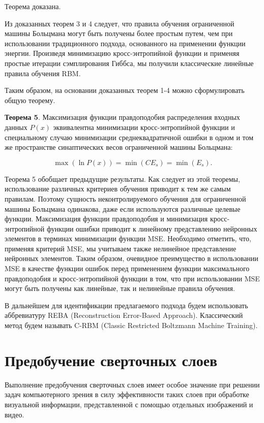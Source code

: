Теорема доказана.

Из доказанных теорем 3 и 4 следует, что правила обучения ограниченной машины Больцмана могут быть получены более простым путем, чем при использовании традиционного подхода, основанного на применении функции энергии. Произведя минимизацию кросс-энтропийной функции и применяя простые итерации сэмплирования Гиббса, мы получили классические линейные правила обучения RBM.

Таким образом, на основании доказанных теорем 1-4 можно сформулировать общую теорему.

\textbf{Теорема 5}. Максимизация функции правдоподобия распределения входных данных $P(x)$ эквивалентна минимизации кросс-энтропийной функции и специальному случаю минимизации среднеквадратичной ошибки в одном и том же пространстве синаптических весов ограниченной машины Больцмана:

\begin{equation}
	\max(\ln P(x)) = \min(CE_s) = \min(E_s).
\end{equation}

Теорема 5 обобщает предыдущие результаты. Как следует из этой теоремы, использование различных критериев обучения приводит к тем же самым правилам. Поэтому сущность неконтролируемого обучения для ограниченной машины Больцмана одинакова, даже если используются различные целевые функции. Максимизация функции правдоподобия и минимизация кросс-энтропийной функции ошибки приводит к линейному представлению нейронных элементов в терминах минимизации функции MSE. Необходимо отметить, что, применяя критерий MSE, мы учитываем также нелинейное представление нейронных элементов. Таким образом, очевидное преимущество в использовании MSE в качестве функции ошибок перед применением функции максимального правдоподобия и кросс-энтропийной функции в том, что при использовании MSE могут быть получены как линейные, так и нелинейные правила обучения.

В дальнейшем для идентификации предлагаемого подхода будем использовать аббревиатуру REBA (Reconstruction Error-Based Approach). Классический метод будем называть C-RBM (Classic Restricted Boltzmann Machine Training).

\section{Предобучение сверточных слоев}

Выполнение предобучения сверточных слоев имеет особое значение при решении задач компьютерного зрения в силу эффективности таких слоев при обработке визуальной информации, представленной с помощью отдельных изображений и видео.

